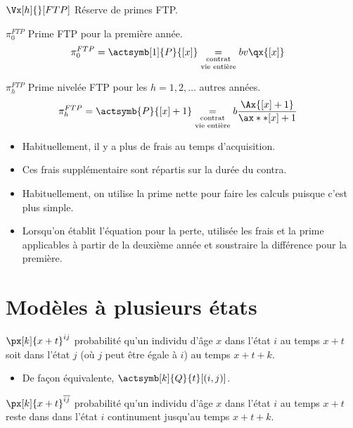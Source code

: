 \documentclass[10pt, french]{article}
\begin{document}
\begin{multicols*}{2}
 
\begin{description}
	\item	$\Vx[h]{}[FTP]$	Réserve de primes FTP.
	\item	$\pi_{0}^{FTP}$	Prime FTP pour la première année.
		\begin{align*}
		\pi_{0}^{FTP}
		&=	\actsymb[1]{P}{[x]}	
		\underset{\scriptsize{\shortstack{contrat\\ vie entière}}}{=}	bv\qx{[x]}
		\end{align*}
	\item	$\pi_{h}^{FTP}$	Prime nivelée FTP pour les $h = 1, 2, \dots$ autres années.
		\begin{align*}
		\pi_{h}^{FTP}
		&=	\actsymb{P}{[x] + 1}	
		\underset{\scriptsize{\shortstack{contrat\\ vie entière}}}{=}	b \frac{\Ax{[x] + 1}}{\ax**{[x] + 1}}
		\end{align*}
\end{description}
\begin{itemize}[leftmargin = *]
	\item	Habituellement, il y a plus de frais au temps d'acquisition.
	\item	Ces frais supplémentaire sont répartis sur la durée du contra.
	\item	Habituellement, on utilise la prime nette pour faire les calculs puisque c'est plus simple.
	\item	Lorsqu'on établit l'équation pour la perte, utilisée les frais et la prime applicables à partir de la deuxième année et soustraire la différence pour la première.
\end{itemize}

\newpage

\section{Modèles à plusieurs états}

\begin{description}
	\item	$\px[k]{x + t}^{ij}$	probabilité qu'un individu d'âge $x$ dans l'état $i$ au temps $x + t$ soit dans l'état $j$ (où $j$ peut être égale à $i$) au temps $x + t + k$.
		\begin{itemize}[leftmargin = *]
		\item	De façon équivalente, $\actsymb[k]{Q}{t}[(i, j)]$.
		\end{itemize}
	\item	$\px[k]{x + t}^{\overline{ij}}$	probabilité qu'un individu d'âge $x$ dans l'état $i$ au temps $x + t$ reste dans dans l'état $i$ continument jusqu'au temps $x + t + k$.
\end{description}


\end{multicols*}
\end{document}
